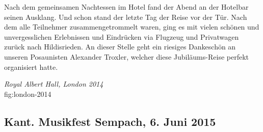 \begin{history}
    Nach dem gemeinsamen Nachtessen im Hotel fand der Abend an der Hotelbar
    seinen Ausklang. Und schon stand der letzte Tag der Reise vor der Tür. Nach
    dem alle Teilnehmer zusammengetrommelt waren, ging es mit vielen schönen und
    unvergesslichen Erlebnissen und Eindrücken via Flugzeug und Privatwagen
    zurück nach Hildisrieden. An dieser Stelle geht ein riesiges Dankeschön an
    unseren Posaunisten Alexander Troxler, welcher diese Jubiläums-Reise perfekt
    organisiert hatte.

\end{history}

{\emph{Royal Albert Hall, London 2014}\\
} {fig:london-2014}


\subsection*{Kant. Musikfest Sempach, 6. Juni 2015}

